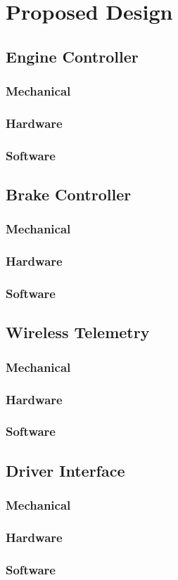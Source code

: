 %
%
%
%

\section{Proposed Design}

\subsection{Engine Controller}

\subsubsection{Mechanical}
\subsubsection{Hardware}
\subsubsection{Software}

\subsection{Brake Controller}

\subsubsection{Mechanical}
\subsubsection{Hardware}
\subsubsection{Software}

\subsection{Wireless Telemetry}

\subsubsection{Mechanical}
\subsubsection{Hardware}
\subsubsection{Software}

\subsection{Driver Interface}

\subsubsection{Mechanical}
\subsubsection{Hardware}
\subsubsection{Software}
